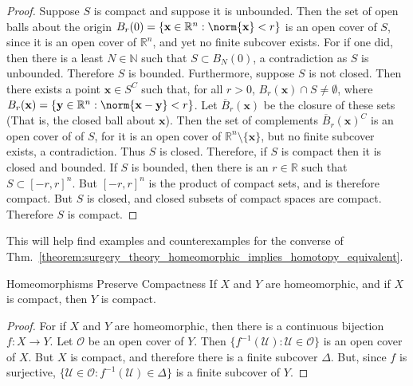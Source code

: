 \documentclass[crop=false,class=book,oneside]{standalone}                      %
\begin{document}
            \begin{proof}
                Suppose $S$ is compact and
                suppose it is unbounded. Then the set of open
                balls about the origin
                $B_{r}(0)=\{\mathbf{x}\in\mathbb{R}^{n}:\norm{\mathbf{x}}<r\}$
                is an open cover of $S$, since it is an open
                cover of $\mathbb{R}^{n}$, and yet no
                finite subcover exists. For if one did, then there
                is a least $N\in\mathbb{N}$ such that
                $S\subset{B_{N}(0)}$, a contradiction as
                $S$ is unbounded. Therefore $S$ is bounded.
                Furthermore, suppose $S$ is
                not closed. Then there exists a point
                $\mathbf{x}\in{S^{C}}$ such that, for all
                $r>0$, $B_{r}(\mathbf{x})\cap{S}\ne\emptyset$,
                where
                $B_{r}(\mathbf{x})=\{\mathbf{y}\in\mathbb{R}^{n}:%
                 \norm{\mathbf{x}-\mathbf{y}}<r\}$.
                Let $\overline{B}_{r}(\mathbf{x})$ be the
                closure of these sets (That is, the closed ball
                about $\mathbf{x}$). Then the set of complements
                $\overline{B}_{r}(\mathbf{x})^{C}$ is an open
                cover of of $S$, for it is an open cover of
                $\mathbb{R}^{n}\setminus\{\mathbf{x}\}$, but no
                finite subcover exists, a contradiction. Thus $S$ is closed.
                Therefore, if $S$ is compact then it is closed and bounded.
                If $S$ is bounded, then there is an $r\in\mathbb{R}$
                such that $S\subset[-r,r]^{n}$. But
                $[-r,r]^{n}$ is the product of compact sets, and
                is therefore compact. But $S$ is closed, and closed
                subsets of compact spaces are compact. Therefore
                $S$ is compact.
            \end{proof}
            This will help find examples and counterexamples for the converse of
            Thm.~\ref{theorem:surgery_theory_homeomorphic_implies_homotopy_equivalent}.
            \begin{ltheorem}{Homeomorphisms Preserve Compactness}
                If $X$ and $Y$ are homeomorphic, and if
                $X$ is compact, then $Y$ is compact.
            \end{ltheorem}
            \begin{proof}
                For if $X$ and $Y$ are homeomorphic, then there
                is a continuous bijection $f:X\rightarrow{Y}$.
                Let $\mathcal{O}$ be an open cover of $Y$.
                Then $\{f^{-1}(\mathcal{U}):\mathcal{U}\in\mathcal{O}\}$
                is an open cover of $X$. But $X$ is compact, and
                therefore there is a finite subcover
                $\Delta$. But, since $f$ is surjective,
                $\{\mathcal{U}\in\mathcal{O}:f^{-1}(\mathcal{U})\in\Delta\}$
                is a finite subcover of $Y$.
            \end{proof}
\end{document}
